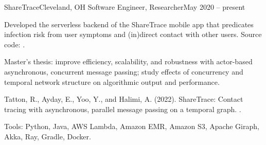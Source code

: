 \begin{ritemize}
{ShareTrace}{Cleveland, OH}
{Software Engineer, Researcher}{May 2020 -- present}
	\item Developed the serverless backend of the ShareTrace mobile app that predicates infection risk from user symptoms and (in)direct contact with other users. Source code: .
	\item Master's thesis: improve efficiency, scalability, and robustness with actor-based asynchronous, concurrent message passing; study effects of concurrency and temporal network structure on algorithmic output and performance.
	\item Tatton, R., Ayday, E., Yoo, Y., and Halimi, A. (2022). ShareTrace: Contact tracing with asynchronous, parallel message passing on a temporal graph.
	 .
	\item Tools: Python, Java, AWS Lambda, Amazon EMR, Amazon S3, Apache Giraph, Akka, Ray, Gradle, Docker.
\end{ritemize}